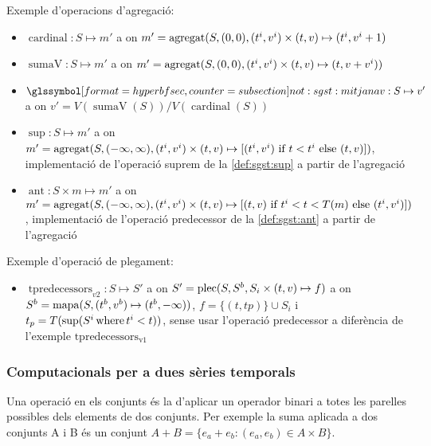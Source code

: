 Exemple d'operacions d'agregació:
\begin{itemize}
\item $\operatorname{cardinal}: S \mapsto m'$ a on $m'=
  \operatorname*{agregat}(S,(0,0),(t^i,v^i)\times(t,v)\mapsto(t^i,v^i+1)$

\item $\operatorname{sumaV}: S \mapsto m'$ a on $m'=
  \operatorname*{agregat}(S,(0,0),(t^i,v^i)\times(t,v)\mapsto(t,v+v^i))$

\item $\glssymbolsec{not:sgst:mitjanav}: S \mapsto v'$ a on $v'=
  V(\operatorname{sumaV}(S)) / V(\operatorname{cardinal}(S))$ 

\item $\operatorname{sup}: S \mapsto m'$ a on $m'=
  \operatorname*{agregat}(S,(-\infty,\infty),(t^i,v^i)\times(t,v)\mapsto [(t^i,v^i)
  \text{ if } t < t^i \text{ else } (t,v) ])$, implementació de
  l'operació suprem de la \autoref{def:sgst:sup} a partir de
  l'agregació

\item $\operatorname{ant}: S \times m \mapsto m'$ a on $m'=
  \operatorname*{agregat}(S,(-\infty,\infty),(t^i,v^i)\times(t,v)\mapsto [(t,v)
  \text{ if } t^i < t < T(m) \text{ else } (t^i,v^i) ])$,
  implementació de l'operació predecessor de la \autoref{def:sgst:ant} a
  partir de l'agregació 
\end{itemize}


Exemple d'operació de plegament:
\begin{itemize}
\item $\operatorname{tpredecessors}_{v2}: S \mapsto S'$ a on $S'=
  \operatorname*{plec}(S,S^b,S_i\times (t,v) \mapsto f)$ a on $S^b =
  \operatorname*{mapa}(S,(t^b,v^b)\mapsto(t^b,-\infty))$, $f= \{(t,tp)\} \cup S_i$ i
  $t_p=T(\sup(S^i \operatorname*{where} t^i < t))$, sense usar l'operació predecessor
  a diferència de l'exemple $\operatorname{tpredecessors_{v1}}$
\end{itemize}




\subsubsection{Computacionals per a dues sèries temporals}

Una operació en els conjunts és la d'aplicar un operador binari a
totes les parelles possibles dels elements de dos conjunts. Per
exemple la suma aplicada a dos conjunts A i B és un conjunt $A + B =
\{ e_a+e_b : (e_a,e_b) \in A\times B \}$.

